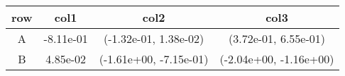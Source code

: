 \begin{tabular}{cccc}
\toprule
row&col1&col2&col3\tabularnewline
\midrule
A&-8.11e-01& (-1.32e-01, 1.38e-02)& (3.72e-01, 6.55e-01)\tabularnewline
B&4.85e-02& (-1.61e+00, -7.15e-01)& (-2.04e+00, -1.16e+00)\tabularnewline
\bottomrule
\end{tabular}
